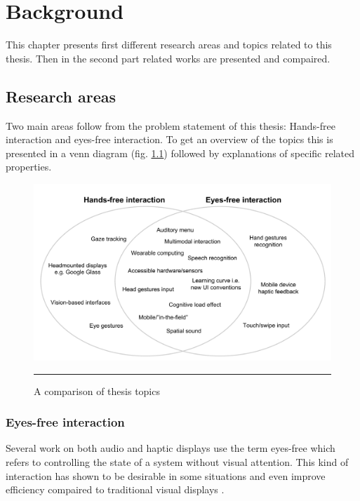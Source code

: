 \chapter{Background}
This chapter presents first different research areas and topics related to this thesis. Then in the second part related works are presented and compaired.


\section{Research areas}
Two main areas follow from the problem statement of this thesis: Hands-free interaction and eyes-free interaction. To get an overview of the topics this is presented in a venn diagram (fig. \ref{fig:Venn}) followed by explanations of specific related properties.

\begin{figure}[htbp]
	\centering
		\includegraphics[width=\textwidth,height=\textheight,keepaspectratio]{./Figures/venn-diagram.pdf}
		\rule{35em}{0.5pt}
	\caption[Venn diagram]{A comparison of thesis topics}
	\label{fig:Venn}
\end{figure}

\subsection{Eyes-free interaction}
Several work on both audio \cite{kajastila_eyes-free_2013,bonner_no-look_2010,brewster_multimodaleyes-freeinteraction_2003,zhao_earpod:_2007,vazquez-alvarez_eyes-free_2011} and haptic \cite{pasquero_haptic_2011,pielot_tactile_2011} displays use the term eyes-free which refers to controlling the state of a system without visual attention. This kind of interaction has shown to be desirable in some situations \cite{oakley_designing_2007,yi_exploring_2012} and even improve efficiency compaired to traditional visual displays \cite{zhao_earpod:_2007}.

